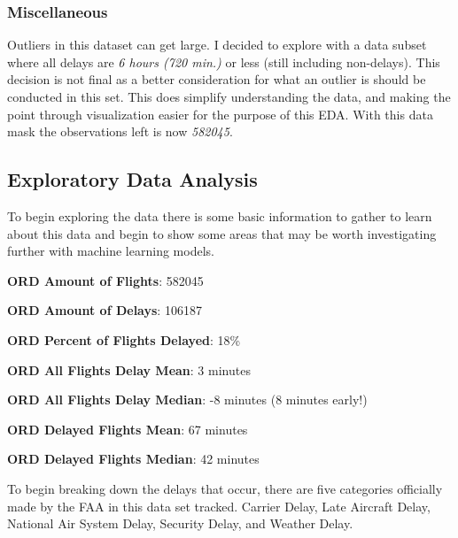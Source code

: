 \documentclass[a4paper,12pt]{article}
\begin{document}
\subsubsection{Miscellaneous}
Outliers in this dataset can get large. I decided to explore with a data subset where all delays are \emph{6 hours (720 min.)} or less (still including non-delays). This decision is not final as a better
consideration for what an outlier is should be conducted in this set. This does simplify understanding the data, and making the point through visualization easier for the purpose of this EDA.
With this data mask the observations left is now \emph{582045}.

\subsection{Exploratory Data Analysis}

To begin exploring the data there is some basic information to gather to learn about this data and begin to show some areas that may be worth investigating further with machine learning models.

\textbf{ORD Amount of Flights}: 582045

\textbf{ORD Amount of Delays}: 106187

\textbf{ORD Percent of Flights Delayed}: 18\%

\textbf{ORD All Flights Delay Mean}: 3 minutes

\textbf{ORD All Flights Delay Median}: -8 minutes (8 minutes early!)

\textbf{ORD Delayed Flights Mean}: 67 minutes

\textbf{ORD Delayed Flights Median}: 42 minutes

To begin breaking down the delays that occur, there are five categories officially made by the FAA in this data set tracked. Carrier Delay, Late Aircraft Delay, National Air System Delay, Security Delay, and Weather Delay.
\end{document}
